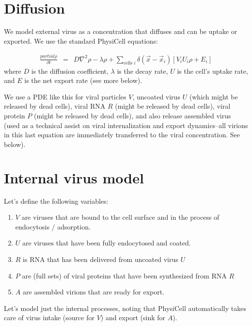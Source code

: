 \documentclass[12point]{article}
\begin{document}
\section{Diffusion}
We model external virus as a concentration that diffuses and can be uptake or exported. We use the standard PhysiCell equations: 

\begin{eqnarray}
\frac{partial \rho }{\partial t} & = & 
D \nabla^2 \rho - \lambda \rho + 
\sum_{\textrm{cells }i} 
\delta( \vec{x} - \vec{x}_i ) \left[ 
V_i U_i \rho + E_i 
\right]
\end{eqnarray}
where $D$ is the diffusion coefficient, $\lambda$ is the decay rate, $U$ is the cell's uptake rate, and $E$ is the net export rate (see more below). 

We use a PDE like this for viral particles $V$, uncoated virus $U$ (which might be released by dead cells), viral RNA $R$ (might be released by dead cells), viral protein $P$ (might be released by dead cells), and also 
release assembled virus (used as a technical assist on viral internalization and export dynamics--all virions in this last equation are immediately transferred to the viral concentration. See below). 

\section{Internal virus model}
Let's define the following variables: 
\begin{enumerate}
\item 
$V$ are viruses that are bound to the cell surface and in the process of endocytosis / adsorption. 

\item 
$U$ are viruses that have been fully endocytosed and coated. 

\item 
$R$ is RNA that has been delivered from uncoated virus $U$

\item 
$P$ are (full sets) of viral proteins that have been synthesized from RNA $R$

\item 
$A$ are assembled virions that are ready for export. 

\end{enumerate}
Let's model just the internal processes, noting that PhysiCell automatically takes care of virus intake (source for $V$) and export (sink for $A$). 
\end{document}

